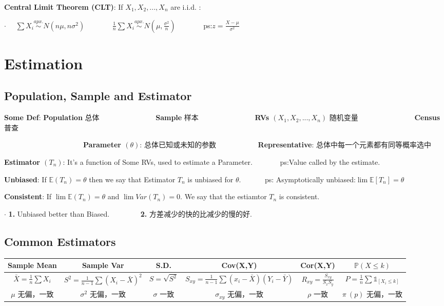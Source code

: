 \documentclass[9pt]{article}
\begin{document}
\textbf{Central Limit Theorem (CLT)}: If $X_1,X_2,...,X_n$ are i.i.d. :

$\cdot$ \ \ $\sum X_i \stackrel{apx.}{\sim}N(n\mu,n\sigma^2)$ \ \ \ \ \ \ \ $\frac{1}{n}\sum X_i \stackrel{apx.}{\sim}N(\mu,\frac{\sigma^2}{n})$ \ \ \ \ \ \ \ ps:$z=\frac{X-\mu}{\sigma^2}$

\section{Estimation} %
\subsection{Population, Sample and Estimator}

\textbf{Some Def}: \textbf{Population} 总体 \ \ \ \ \ \ \ \ \ \ \ \ \ \ \ \textbf{Sample} 样本 \ \ \ \ \ \ \ \ \ \ \ \ \ \ \ \textbf{RVs $(X_1,X_2,...,X_n)$} 随机变量 \ \ \ \ \ \ \ \ \ \ \ \ \ \ \ \textbf{Census} 普查

\ \ \ \ \ \ \ \ \ \ \ \ \ \ \ \ \ \ \ \ \ \ \textbf{Parameter $(\theta)$}: 总体已知或未知的参数 \ \ \ \ \ \ \ \ \ \ \ \textbf{Representative}: 总体中每一个元素都有同等概率选中

\textbf{Estimator $(T_n)$}: It's a function of Some RVs, used to estimate a Parameter. \ \ \ \ \ \ \ ps:Value called by the estimate.

\textbf{Unbiased}: If $\mathbb{E}(T_n)=\theta$ then we say that Estimator $T_n$ is unbiased for $\theta$. \ \ \ \ \ \ ps: Asymptotically unbiased:$\lim\mathbb{E}[T_n]=\theta$

\textbf{Consistent}: If $\lim\mathbb{E}(T_n)=\theta$ and $\lim Var(T_n)=0.$ We say that the estiamtor $T_n$ is consistent.

$\cdot$ \textbf{1.} Unbiased better than Biased. \ \ \ \ \ \ \  \ \textbf{2.} 方差减少的快的比减少的慢的好.

\subsection{Common Estimators}

\vspace{-0.4cm}
\begin{longtable}{|c|c|c|c|c|c|}
    \hline
    \textbf{Sample Mean}          & \textbf{Sample Var}                     & S.D.           & Cov(X,Y)                                              & Cor(X,Y)                       & $\mathbb{P}(X\leq k)$                        \\
    \hline
    \hline
    $\bar{X}=\frac{1}{n}\sum X_i$ & $S^2=\frac{1}{n-1}\sum (X_i-\bar{X})^2$ & $S=\sqrt{S^2}$ & $S_{xy}=\frac{1}{n-1}\sum (x_i-\bar{X})(Y_i-\bar{Y})$ & $R_{xy}=\frac{S_{xy}}{S_xS_y}$ & $P=\frac{1}{n}\sum \mathbb{1}_{[X_i\leq k]}$ \\
    \hline
    $\mu$ 无偏，一致                   & $\sigma^2$ 无偏，一致                        & $\sigma$ 一致    & $\sigma_{xy}$ 无偏，一致                                   & $\rho$ 一致                      & $\pi \ (p) $ 无偏，一致                           \\
    \hline
\end{longtable}
\vspace{-0.4cm}
\end{document}

